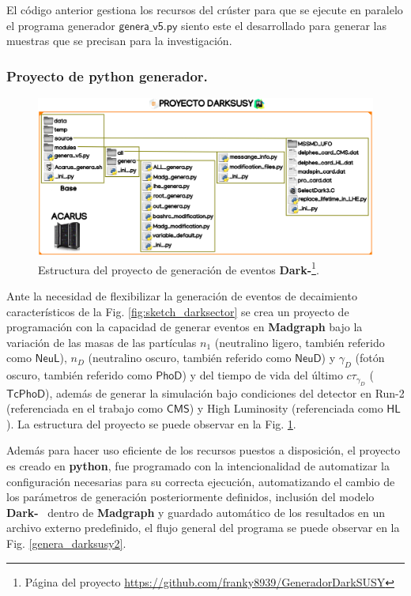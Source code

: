 El código anterior gestiona los recursos del crúster para que se ejecute en paralelo el programa generador $\textsf{genera\_v5.py}$ siento este el desarrollado para generar las muestras que se precisan para la investigación.

\subsubsection{Proyecto de python generador.}
\begin{figure}[!h]
\centering
\includegraphics[width=1\textwidth]{Simulacion/imagenes/proyecto_darksusy.png}
\caption[Estructura del proyecto de generación de eventos \textbf{Dark-\SUSY}.]{Estructura del proyecto de generación de eventos \textbf{Dark-\SUSY}\footnote{Página del proyecto \href{https://github.com/franky8939/GeneradorDarkSUSY}{https://github.com/franky8939/GeneradorDarkSUSY}}.}
\label{genera_darksusy0}
\end{figure}

Ante la necesidad de flexibilizar la generación de eventos de decaimiento característicos de la Fig. \ref{fig:sketch_darksector} se crea un proyecto de programación con la capacidad de generar eventos en \textbf{Madgraph} bajo la variación de las masas de las partículas $n_1$ (neutralino ligero, también referido como $\textsf{NeuL}$), $n_D$ (neutralino oscuro, también referido como $\textsf{NeuD}$) y $\gamma_D$ (fotón oscuro, también referido como $\textsf{PhoD}$) y del tiempo de vida del último $c\tau_{\gamma_D}$ ($\textsf{TcPhoD}$), además de generar la simulación bajo condiciones del detector en Run-2 (referenciada en el trabajo como $\textsf{CMS}$) y High Luminosity (referenciada como $\textsf{HL}$). La estructura del proyecto se puede observar en la Fig. \ref{genera_darksusy0}.

Además para hacer uso eficiente de los recursos puestos a disposición, el proyecto es creado en \textbf{python}, fue programado con la intencionalidad de automatizar la configuración necesarias para su correcta ejecución, automatizando el cambio de los parámetros de generación posteriormente definidos, inclusión del modelo \textbf{Dark-}\SUSY ~ dentro de \textbf{Madgraph} y guardado automático de los resultados en un archivo externo predefinido, el flujo general del programa se puede observar en la Fig. \ref{genera_darksusy2}.

